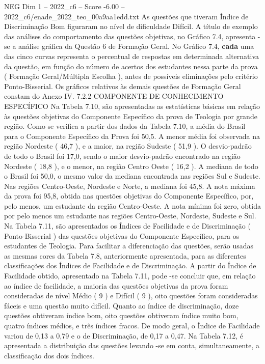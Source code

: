 \begin{textsample}{NEG Dim 1 – 2022\_c6 – Score -6.00 – 2022\_c6/enade\_2022\_teo\_00a9aa1edd.txt}
As questões que tiveram Índice de Discriminação Bom figuraram no nível de dificuldade Difícil.
A título de exemplo das análises do comportamento das questões objetivas, no Gráfico 7.4, apresenta -se a análise gráfica da Questão 6 de Formação Geral.
No Gráfico 7.4, \textbf{cada} uma das cinco curvas representa o percentual de respostas em determinada alternativa da questão, em função do número de acertos dos estudantes nessa parte da prova ( Formação Geral/Múltipla Escolha ), antes de possíveis eliminações pelo critério Ponto-Bisserial.
Os gráficos relativos às demais questões de Formação Geral constam do Anexo IV. 7.2.2 COMPONENTE DE CONHECIMENTO ESPECÍFICO Na Tabela 7.10, são apresentadas as estatísticas básicas em relação às questões objetivas do Componente Específico da prova de Teologia por grande região.
Como se verifica a partir dos dados da Tabela 7.10, a média do Brasil para o Componente Específico da Prova foi 50,5.
A menor média foi observada na região Nordeste ( 46,7 ), e a maior, na região Sudeste ( 51,9 ).
O desvio-padrão de todo o Brasil foi 17,0, sendo o maior desvio-padrão encontrado na região Nordeste ( 18,8 ), e o menor, na região Centro Oeste ( 16,2 ).
A mediana de todo o Brasil foi 50,0, o mesmo valor da mediana encontrada nas regiões Sul e Sudeste.
Nas regiões Centro-Oeste, Nordeste e Norte, a mediana foi 45,8.
A nota máxima da prova foi 95,8, obtida nas questões objetivas do Componente Específico, por, pelo menos, um estudante da região Centro-Oeste.
A nota mínima foi zero, obtida por pelo menos um estudante nas regiões Centro-Oeste, Nordeste, Sudeste e Sul.
Na Tabela 7.11, são apresentados os Índices de Facilidade e de Discriminação ( Ponto-Bisserial ) das questões objetivas do Componente Específico, para os estudantes de Teologia.
Para facilitar a diferenciação das questões, serão usadas as mesmas cores da Tabela 7.8, anteriormente apresentada, para as diferentes classificações dos Índices de Facilidade e de Discriminação.
A partir do Índice de Facilidade obtido, apresentado na Tabela 7.11, pode -se concluir que, em relação ao índice de facilidade, a maioria das questões objetivas da prova foram consideradas de nível Médio ( 9 ) e Difícil ( 9 ), oito questões foram consideradas fáceis e uma questão muito difícil.
Quanto ao índice de discriminação, doze questões obtiveram índice bom, oito questões obtiveram índice muito bom, quatro índices médios, e três índices fracos.
De modo geral, o Índice de Facilidade variou de 0,13 a 0,79 e o de Discriminação, de 0,17 a 0,47.
Na Tabela 7.12, é apresentada a distribuição das questões levando -se em conta, simultaneamente, a classificação dos dois índices.

\end{textsample}

